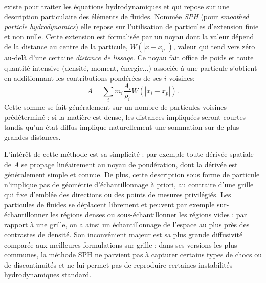  existe pour traiter les équations hydrodynamiques et qui repose sur une description particulaire des éléments de fluides. Nommée \textit{SPH} (pour \textit{smoothed particle hydrodynamics}) elle repose sur l'utilisation de particules d'extension finie et non nulle. Cette extension est formalisée par un noyau dont la valeur dépend de la distance au centre de la particule, $W(|x-x_p|)$, valeur qui tend vers zéro au-delà d'une certaine \textit{distance de lissage}. Ce noyau fait office de poids et toute quantité intensive (densité, moment, énergie...) associée à une particule s'obtient en additionnant les contributions pondérées de ses $i$ voisines:
\begin{equation}
A=\sum_i m_i \frac{A_i}{\rho_i} W(|x_i-x_p|).
\end{equation} 
Cette somme se fait généralement sur un nombre de particules voisines prédéterminé : si la matière est dense, les distances impliquées seront courtes tandis qu'un état diffus implique naturellement une sommation sur de plus grandes distances.
 
L'intérêt de cette méthode est sa simplicité : par exemple toute dérivée spatiale de $A$ se propage linéairement au noyau de pondération, dont la dérivée est généralement simple et connue. De plus, cette description sous forme de particule n'implique pas de géométrie d'échantillonnage à priori, au contraire d'une grille qui fixe d'emblée des directions ou des points de mesures privilégiés. Les particules de fluides se déplacent librement et peuvent par exemple sur-échantillonner les régions denses ou sous-échantillonner les régions vides : par rapport à une grille, on a ainsi un échantillonnage de l'espace au plus près des contrastes de densité. Son inconvénient majeur est sa plus grande diffusivité comparée aux meilleures formulations sur grille : dans ses versions les plus communes, la méthode SPH ne parvient pas à capturer certains types de chocs ou de discontinuités et ne lui permet pas de reproduire certaines instabilités hydrodynamiques standard. 

